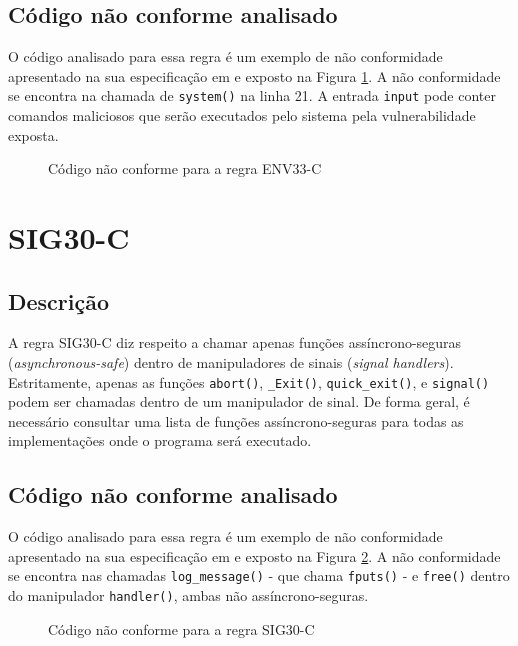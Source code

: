 \subsection{Código não conforme analisado}

O código analisado para essa regra é um exemplo de não conformidade apresentado na sua especificação em \cite{ccert} e exposto na Figura \ref{fig:ENV33-C}. A não conformidade se encontra na chamada de \texttt{system()} na linha 21. A entrada \texttt{input} pode conter comandos maliciosos que serão executados pelo sistema pela vulnerabilidade exposta.

\begin{figure}[h!]
  \centering
  
  \caption{Código não conforme para a regra ENV33-C}
\label{fig:ENV33-C}
\end{figure}

\section{SIG30-C}
\subsection{Descrição}

A regra SIG30-C diz respeito a chamar apenas funções assíncrono-seguras (\textit{asynchronous-safe}) dentro de manipuladores de sinais (\textit{signal handlers}). Estritamente, apenas as funções \texttt{abort()}, \texttt{\_Exit()}, \texttt{quick\_exit()}, e \texttt{signal()} podem ser chamadas dentro de um manipulador de sinal. De forma geral, é necessário consultar uma lista de funções assíncrono-seguras para todas as implementações onde o programa será executado.

\subsection{Código não conforme analisado}

O código analisado para essa regra é um exemplo de não conformidade apresentado na sua especificação em \cite{ccert} e exposto na Figura \ref{fig:SIG30-C}. A não conformidade se encontra nas chamadas \texttt{log\_message()} - que chama \texttt{fputs()} - e \texttt{free()} dentro do manipulador \texttt{handler()}, ambas não assíncrono-seguras.

\begin{figure}[h!]
  \centering
  
  \caption{Código não conforme para a regra SIG30-C}
\label{fig:SIG30-C}
\end{figure}

